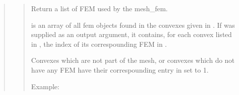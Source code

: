 \documentclass[a4paper,11pt,english]{sphinxmanual}
\begin{document}
\begin{quote}
\begin{quote}

Return a list of FEM used by the mesh\_fem.

 is an array of all fem objects found in the convexes
given in . If  was supplied as an output argument,
it contains, for each convex listed in , the index of its
correspounding FEM in .

Convexes which are not part of the mesh, or convexes which do not
have any FEM have their correspounding entry in  set to \sphinxhyphen{}1.

Example:

\begin{sphinxVerbatim}[commandchars=\\\{\}]
\PYG{p}{[}\PYG{p}{]} 
   
 
\end{sphinxVerbatim}
\end{quote}

\begin{quote}


\end{quote}
\end{quote}
\end{document}
